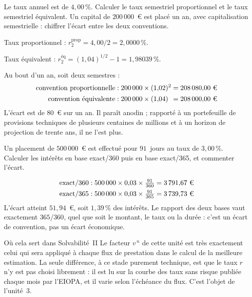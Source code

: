 \begin{exercice}
Le taux annuel est de $4{,}00\,\%$. Calculer le taux semestriel proportionnel et
le taux semestriel équivalent. Un capital de $200\,000$~\euro{} est placé un an,
avec capitalisation semestrielle : chiffrer l'écart entre les deux conventions.
\end{exercice}

\begin{corrige}
Taux proportionnel : $r^{\text{prop}}_{2} = 4{,}00/2 = 2{,}0000\,\%$.

Taux équivalent : $r^{\text{éq}}_{2} = (1{,}04)^{1/2} - 1 = 1{,}98039\,\%$.

\medskip
Au bout d'un an, soit deux semestres :
\begin{align*}
  \text{convention proportionnelle} &: 200\,000 \times (1{,}02)^{2} = 208\,080{,}00\ \text{\euro} \\
  \text{convention équivalente}     &: 200\,000 \times (1{,}04)\phantom{^{2}} = 208\,000{,}00\ \text{\euro}
\end{align*}
L'écart est de $80$~\euro{} sur un an. Il paraît anodin ; rapporté à un
portefeuille de provisions techniques de plusieurs centaines de millions et à un
horizon de projection de trente ans, il ne l'est plus.
\end{corrige}

\begin{exercice}
Un placement de $500\,000$~\euro{} est effectué pour $91$~jours au taux de
$3{,}00\,\%$. Calculer les intérêts en base exact/360 puis en base exact/365, et
commenter l'écart.
\end{exercice}

\begin{corrige}
\begin{align*}
  \text{exact}/360 &: 500\,000 \times 0{,}03 \times \tfrac{91}{360} = 3\,791{,}67\ \text{\euro} \\
  \text{exact}/365 &: 500\,000 \times 0{,}03 \times \tfrac{91}{365} = 3\,739{,}73\ \text{\euro}
\end{align*}
L'écart atteint $51{,}94$~\euro, soit $1{,}39\,\%$ des intérêts. Le rapport des
deux bases vaut exactement $365/360$, quel que soit le montant, le taux ou la
durée : c'est un écart de convention, pas un écart économique.
\end{corrige}

\begin{pont}{Où cela sert dans Solvabilité~II}
Le facteur $v^{\,n}$ de cette unité est très exactement celui qui sera appliqué
à chaque flux de prestation dans le calcul de la meilleure estimation. La seule
différence, à ce stade purement technique, est que le taux $r$ n'y est pas choisi
librement : il est lu sur la courbe des taux sans risque publiée chaque mois par
l'EIOPA, et il varie selon l'échéance du flux. C'est l'objet de l'unité~3.
\end{pont}

